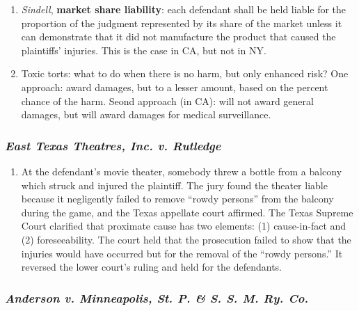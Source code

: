 \begin{enumerate}
\begin{enumerate}
{        Tice}: not clear whether it applies to these joint tortfeasor cases or 
        not.
    \end{enumerate}
    \item \emph{Sindell}, \textbf{market share liability}: each defendant 
    shall be held liable for the proportion of the judgment represented by its 
    share of the market unless it can demonstrate that it did not manufacture 
    the product that caused the plaintiffs' injuries. This is the case in CA, 
    but not in NY.
    \item Toxic torts: what to do when there is no harm, but only enhanced 
    risk? One approach: award damages, but to a lesser amount, based on the 
    percent chance of the harm. Seond approach (in CA): will not award general 
    damages, but will award damages for medical surveillance.
\end{enumerate}

\subsubsection{\emph{East Texas Theatres, Inc. v. Rutledge}}

\begin{enumerate}
    \item At the defendant's movie theater, somebody threw a bottle from a 
    balcony which struck and injured the plaintiff. The jury found the theater 
    liable because it negligently failed to remove ``rowdy persons'' from the 
    balcony during the game, and the Texas appellate court affirmed. The Texas 
    Supreme Court clarified that proximate cause has two elements: (1) 
    cause-in-fact and (2) foreseeability. The court held that the prosecution 
    failed to show that the injuries would have occurred but for the removal 
    of the ``rowdy persons.'' It reversed the lower court's ruling and held 
    for the defendants.
\end{enumerate}

\subsubsection{\emph{Anderson v. Minneapolis, St. P. \& S. S. M. Ry. Co.}}

